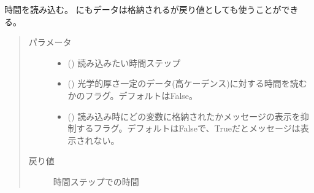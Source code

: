 \documentclass[letterpaper,10pt,dvipdfmx,report]{sphinxmanual}
\begin{document}
\begin{fulllineitems}
\label{\detokenize{io:R2D2.R2D2_data.read_time}}
時間を読み込む。  にもデータは格納されるが戻り値としても使うことができる。
\begin{quote}\begin{description}
\item[{パラメータ}] \leavevmode\begin{itemize}
\item {} 
 () \sphinxhyphen{}\sphinxhyphen{} 読み込みたい時間ステップ

\item {} 
 () \sphinxhyphen{}\sphinxhyphen{} 光学的厚さ一定のデータ(高ケーデンス)に対する時間を読むかのフラグ。デフォルトはFalse。

\item {} 
 () \sphinxhyphen{}\sphinxhyphen{} 読み込み時にどの変数に格納されたかメッセージの表示を抑制するフラグ。デフォルトはFalseで、Trueだとメッセージは表示されない。

\end{itemize}

\item[{戻り値}] \leavevmode
時間ステップでの時間

\end{description}\end{quote}

\end{fulllineitems}

\end{document}
